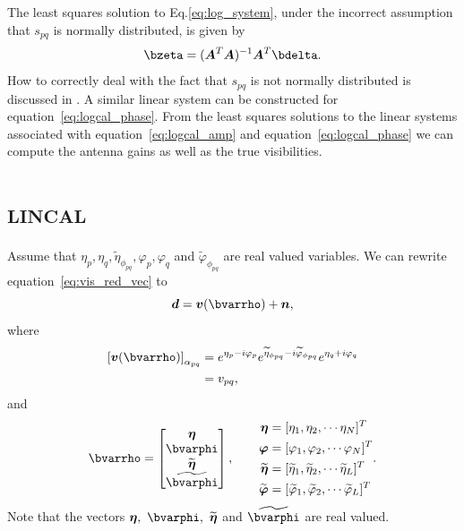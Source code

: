 \documentclass[useAMS,usenatbib]{mn2e}
\newcommand{\bA}{\bmath{A}}
\newcommand{\bd}{\bmath{d}}
\newcommand{\bv}{\bmath{v}}
\newcommand{\bn}{\bmath{n}}
\begin{document}
The least squares solution to Eq.\ref{eq:log_system}, under the incorrect assumption that $s_{pq}$ is normally distributed, is given by
\begin{equation}
\bzeta = (\bA^T\bA)^{-1} \bA^T\bdelta. 
\end{equation}
How to correctly deal with the fact that $s_{pq}$ is not normally distributed is discussed in \citep{Liu2010}. A similar linear system can be constructed for equation~\ref{eq:logcal_phase}. 
From the least squares solutions to the linear systems associated with equation~\ref{eq:logcal_amp} and equation~\ref{eq:logcal_phase} we can compute the antenna gains as well as the true visibilities.

\section{\textsc{lincal}}
\label{sec:lincal}
Assume that $\eta_p,\eta_q,\widetilde{\eta}_{\phi_{pq}},\varphi_p,\varphi_q$ and $\widetilde{\varphi}_{\phi_{pq}}$ are real valued variables.
We can rewrite equation~\ref{eq:vis_red_vec} to \citep{Liu2010}
\begin{equation}
\label{eq:lincal_vec}
\bd = \bv(\bvarrho) + \bn, 
\end{equation}
where 
\begin{align}
\left [ \bv(\bvarrho) \right ]_{\alpha_{pq}} &= e^{\eta_p - i \varphi_p} e^{\widetilde{\eta}_{\phi_{pq}}- i \widetilde{\varphi}_{\phi_{pq}}} e^{\eta_q + i \varphi_q}\\
&= v_{pq},
\end{align}
and
\begin{equation}
\bvarrho = 
\begin{bmatrix}
\bmath{\eta} \\
\bvarphi \\
\widetilde{\bmath{\eta}} \\
\widetilde{\bvarphi}
\end{bmatrix},\qquad
\begin{aligned}
\bmath{\eta} &= [\eta_1, \eta_2,\cdots \eta_N]^T\\
 \bmath{\varphi} &= [\varphi_1, \varphi_2,\cdots \varphi_N]^T\\
 \widetilde{\bmath{\eta}} &= [\widetilde{\eta}_1, \widetilde{\eta}_2,\cdots \widetilde{\eta}_L]^T\\
 \widetilde{\bmath{\varphi}} &= [\widetilde{\varphi}_1, \widetilde{\varphi}_2,\cdots \widetilde{\varphi}_L]^T
\end{aligned}.
\label{eq:help}
\end{equation}
Note that the vectors $\bmath{\eta},~\bvarphi,~\widetilde{\bmath{\eta}}$ and $\widetilde{\bvarphi}$ are real valued.
\end{document}
